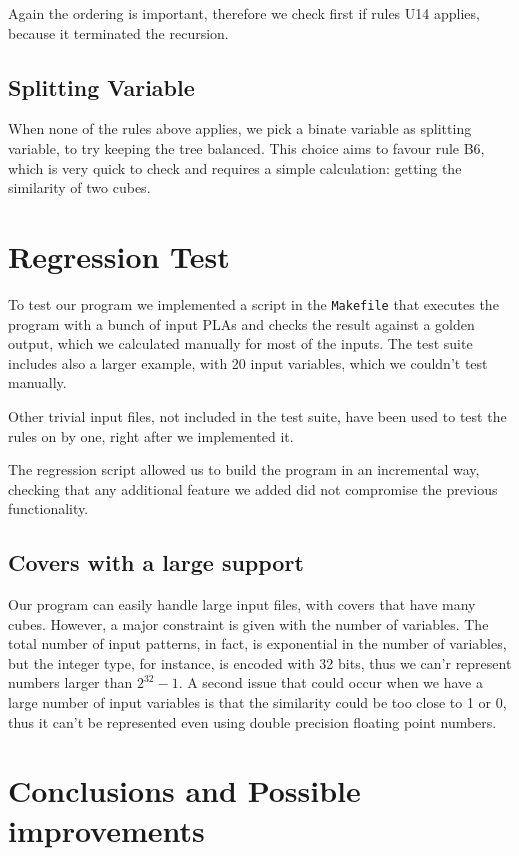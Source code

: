 \documentclass{acm_proc_article-sp}
\begin{document}
Again the ordering is important, therefore we check first if rules U14 applies,
because it terminated the recursion.

\subsection{Splitting Variable}

When none of the rules above applies, we pick a binate variable as splitting
variable, to try keeping the tree balanced. This choice aims to favour rule B6,
which is very quick to check and requires a simple calculation: getting the
similarity of two cubes.

\section{Regression Test}

To test our program we implemented a script in the \texttt{Makefile} that
executes the program with a bunch of input PLAs and checks the result against a
golden output, which we calculated manually for most of the inputs.
The test suite includes also a larger example, with 20 input variables,
which we couldn't test manually.

Other trivial input files, not included in the test suite, have been used to
test the rules on by one, right after we implemented it.

The regression script allowed us to build the program in an incremental way,
checking that any additional feature we added did not compromise the
previous functionality.


\subsection{Covers with a large support}

Our program can easily handle large input files, with covers that have many
cubes. However, a major constraint is given with the number of variables.
The total number of input patterns, in fact, is exponential in the number
of variables, but the integer type, for instance, is encoded with 32 bits,
thus we can'r represent numbers larger than $2^{32} - 1$.
A second issue that could occur when we have a large number of input variables
is that the similarity could be too close to 1 or 0, thus it can't be represented
even using double precision floating point numbers.

\section{Conclusions and Possible improvements}
\end{document}
